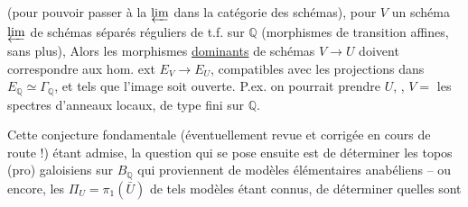 (pour pouvoir passer à la $\varprojlim$ dans la catégorie des schémas), pour $V$ un schéma $\varprojlim$ de schémas séparés réguliers de t.f. sur $\mathbb{Q}$ (morphismes de transition affines, sans plus), Alors les morphismes \uline{dominants} de schémas $V\longrightarrow U$ doivent correspondre aux hom. ext $E_V\longrightarrow E_U$, compatibles avec les projections dans $E_{\mathbb{Q}}\simeq\Gamma_{\mathbb{Q}}$, et tels que l'image soit ouverte. P.ex. on pourrait prendre  $U$, , $V=$ les spectres d'anneaux locaux,  de type fini sur $\mathbb{Q}$.


Cette conjecture fondamentale (éventuellement revue et corrigée en cours de route !) étant admise, la question qui se pose ensuite est de déterminer les topos (pro) galoisiens sur $B_{\mathbb{Q}}$ qui proviennent de modèles élémentaires anabéliens -- ou encore, les $\Pi_U=\pi_1(\bar U)$ de tels modèles étant connus, de déterminer quelles sont
